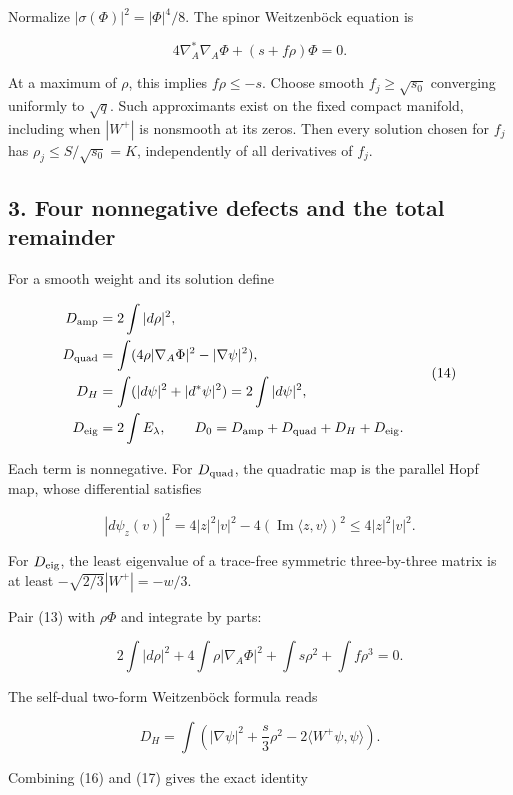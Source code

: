 \documentclass[
  11pt,
]{article}
\begin{document}
Normalize \(|\sigma(\Phi)|^2=|\Phi|^4/8\). The spinor Weitzenböck
equation is

\[
 4\nabla_A^*\nabla_A\Phi+(s+f\rho)\Phi=0.
 \tag{13}
\]

At a maximum of \(\rho\), this implies \(f\rho\le-s\). Choose smooth
\(f_j\ge\sqrt{s_0}\) converging uniformly to \(\sqrt q\). Such
approximants exist on the fixed compact manifold, including when
\(|W^+|\) is nonsmooth at its zeros. Then every solution chosen for
\(f_j\) has \(\rho_j\le S/\sqrt{s_0}=K\), independently of all
derivatives of \(f_j\).

\hypertarget{four-nonnegative-defects-and-the-total-remainder}{%
\subsection{3. Four nonnegative defects and the total
remainder}\label{four-nonnegative-defects-and-the-total-remainder}}

For a smooth weight and its solution define

\[
\begin{aligned}
 D_{\rm amp}&=2\int|d\rho|^2,\\
 D_{\rm quad}&=\int(4\rho|\nabla_A\Phi|^2-|\nabla\psi|^2),\\
 D_H&=\int(|d\psi|^2+|d^*\psi|^2)=2\int|d\psi|^2,\\
 D_{\rm eig}&=2\int E_\lambda,
 \qquad D_0=D_{\rm amp}+D_{\rm quad}+D_H+D_{\rm eig}.
\end{aligned}
\tag{14}
\]

Each term is nonnegative. For \(D_{\rm quad}\), the quadratic map is the
parallel Hopf map, whose differential satisfies

\[
 |d\psi_z(v)|^2
 =4|z|^2|v|^2-4(\operatorname{Im}\langle z,v\rangle)^2
 \le4|z|^2|v|^2.
 \tag{15}
\]

For \(D_{\rm eig}\), the least eigenvalue of a trace-free symmetric
three-by-three matrix is at least \(-\sqrt{2/3}|W^+|=-w/3\).

Pair (13) with \(\rho\Phi\) and integrate by parts:

\[
 2\int|d\rho|^2+4\int\rho|\nabla_A\Phi|^2
          +\int s\rho^2+\int f\rho^3=0.
 \tag{16}
\]

The self-dual two-form Weitzenböck formula reads

\[
 D_H=\int\left(|\nabla\psi|^2+\frac s3\rho^2
                    -2\langle W^+\psi,\psi\rangle\right).
 \tag{17}
\]

Combining (16) and (17) gives the exact identity
\end{document}
